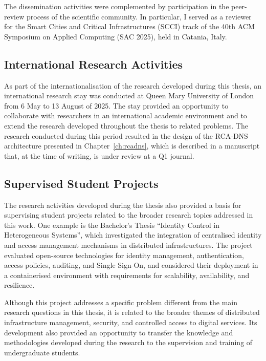 The dissemination activities were complemented by participation in the peer-review process of the scientific community. In particular, I served as a reviewer for the Smart Cities and Critical Infrastructures (SCCI) track of the 40th ACM Symposium on Applied Computing (SAC 2025), held in Catania, Italy.

\subsection{International Research Activities}
\label{sc:conclusion_internationalisation}

As part of the internationalisation of the research developed during this thesis, an international research stay was conducted at Queen Mary University of London from 6 May to 13 August of 2025. The stay provided an opportunity to collaborate with researchers in an international academic environment and to extend the research developed throughout the thesis to related problems. The research conducted during this period resulted in the design of the RCA-DNS architecture presented in Chapter~\ref{ch:rcadns}, which is described in a manuscript that, at the time of writing, is under review at a Q1 journal.

\subsection{Supervised Student Projects}
\label{sc:conclusion_student_projects}

The research activities developed during the thesis also provided a basis for supervising student projects related to the broader research topics addressed in this work. One example is the Bachelor's Thesis ``Identity Control in Heterogeneous Systems'', which investigated the integration of centralised identity and access management mechanisms in distributed infrastructures. The project evaluated open-source technologies for identity management, authentication, access policies, auditing, and Single Sign-On, and considered their deployment in a containerised environment with requirements for scalability, availability, and resilience.

Although this project addresses a specific problem different from the main research questions in this thesis, it is related to the broader themes of distributed infrastructure management, security, and controlled access to digital services. Its development also provided an opportunity to transfer the knowledge and methodologies developed during the research to the supervision and training of undergraduate students.

